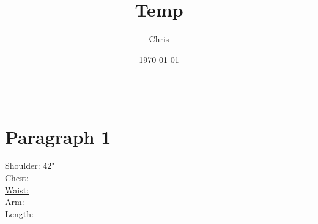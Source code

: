\documentclass{article}
\title{Temp}
\author{Chris}
\date{\today}
\begin{document}
\maketitle
\par\rule{\textwidth}{1pt}
\section{Paragraph 1}
\url{Shoulder:} 42"\\
\url{Chest:}\\
\url{Waist:}\\
\url{Arm:} \\
\url{Length:} \\
\end{document}
